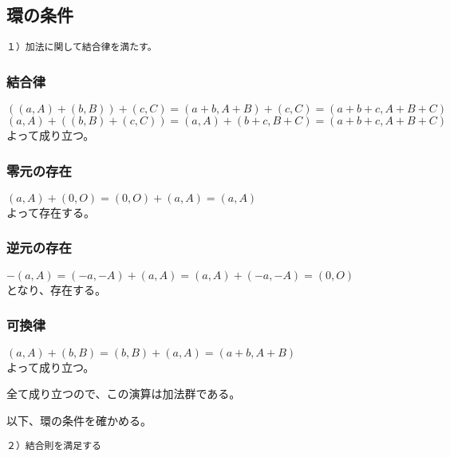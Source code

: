 \documentclass[
]{article}
\begin{document}
\hypertarget{ux74b0ux306eux6761ux4ef6}{%
\subsection{環の条件}\label{ux74b0ux306eux6761ux4ef6}}

\begin{verbatim}
１）加法に関して結合律を満たす。  
\end{verbatim}

\hypertarget{ux7d50ux5408ux5f8b}{%
\subsubsection{結合律}\label{ux7d50ux5408ux5f8b}}

\(((a,A)+(b,B))+(c,C)=(a+b,A+B)+(c,C)=(a+b+c,A+B+C)\)
\((a,A)+((b,B)+(c,C))=(a,A)+(b+c,B+C)=(a+b+c,A+B+C)\)\\
よって成り立つ。

\hypertarget{ux96f6ux5143ux306eux5b58ux5728}{%
\subsubsection{零元の存在}\label{ux96f6ux5143ux306eux5b58ux5728}}

\((a,A)+(0,O)=(0,O)+(a,A)=(a,A)\)\\
よって存在する。

\hypertarget{ux9006ux5143ux306eux5b58ux5728}{%
\subsubsection{逆元の存在}\label{ux9006ux5143ux306eux5b58ux5728}}

\(-(a,A)=(-a,-A)+(a,A)=(a,A)+(-a,-A)=(0,O)\)\\
となり、存在する。

\hypertarget{ux53efux63dbux5f8b}{%
\subsubsection{可換律}\label{ux53efux63dbux5f8b}}

\((a,A)+(b,B)=(b,B)+(a,A)=(a+b,A+B)\)\\
よって成り立つ。

全て成り立つので、この演算は加法群である。

以下、環の条件を確かめる。

\begin{verbatim}
２）結合則を満足する  
\end{verbatim}
\end{document}
